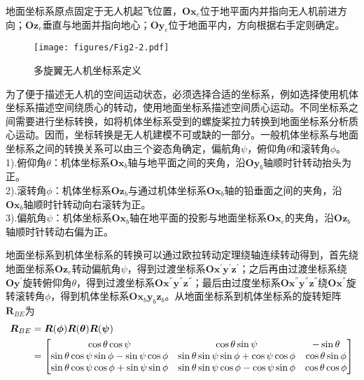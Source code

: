 地面坐标系原点固定于无人机起飞位置，$\boldsymbol{O} \boldsymbol{x}_e$位于地平面内并指向无人机前进方向；$\boldsymbol{O} \boldsymbol{z}_e$垂直与地面并指向地心；$\boldsymbol{O} \boldsymbol{y}_e$位于地面平内，方向根据右手定则确定。

\begin{figure}[h]
\centering
\texttt{[image: figures/Fig2-2.pdf]}
\caption{多旋翼无人机坐标系定义}
\label{fig2.2}
\end{figure}

为了便于描述无人机的空间运动状态，必须选择合适的坐标系，例如选择使用机体坐标系描述空间绕质心的转动，使用地面坐标系描述空间质心运动。不同坐标系之间需要进行坐标转换，如将机体坐标系受到的螺旋桨拉力转换到地面坐标系分析质心运动。因而，坐标转换是无人机建模不可或缺的一部分。一般机体坐标系与地面坐标系之间的转换关系可以由三个姿态角确定，偏航角$\psi$，俯仰角$\theta$和滚转角$\phi$。\\
1).俯仰角$\theta$：机体坐标系$\boldsymbol{O} \boldsymbol{x}_b$轴与地平面之间的夹角，沿$\boldsymbol{O} \boldsymbol{y}_b$轴顺时针转动抬头为正。\\
2).滚转角$\phi$：机体坐标系$\boldsymbol{O} \boldsymbol{z}_b$与通过机体坐标系$\boldsymbol{O} \boldsymbol{x}_b$轴的铅垂面之间的夹角，沿$\boldsymbol{O} \boldsymbol{x}_b$轴顺时针转动向右滚转为正。\\
3).偏航角$\psi$：机体坐标系$\boldsymbol{O} \boldsymbol{x}_b$轴在地平面的投影与地面坐标系$\boldsymbol{O} \boldsymbol{x}_e$的夹角，沿$\boldsymbol{O} \boldsymbol{z}_b$轴顺时针转动右偏为正。

地面坐标系到机体坐标系的转换可以通过欧拉转动定理绕轴连续转动得到，首先绕地面坐标系$\boldsymbol{O} \boldsymbol{z}_e$转动偏航角$\psi$，得到过渡坐标系$\boldsymbol{O} \boldsymbol{x}^{'} \boldsymbol{y}^{'} \boldsymbol{z}^{'}$；之后再由过渡坐标系绕$\boldsymbol{O} \boldsymbol{y}^{'}$旋转俯仰角$\theta$，得到过渡坐标系$\boldsymbol{O} \boldsymbol{x}^{''} \boldsymbol{y}^{''} \boldsymbol{z}^{''}$；最后由过度坐标系$\boldsymbol{O} \boldsymbol{x}^{''} \boldsymbol{y}^{''} \boldsymbol{z}^{''}$绕$\boldsymbol{O} \boldsymbol{x}^{''}$旋转滚转角$\phi$，得到机体坐标系$\boldsymbol{O} \boldsymbol{x}_b \boldsymbol{y}_b \boldsymbol{z}_b$。从地面坐标系到机体坐标系的旋转矩阵$\boldsymbol{R}_{BE}$为
\begin{equation}
\label{equ2.1}
\begin{aligned}
\boldsymbol{R}_{BE} 
&= \boldsymbol{R}(\boldsymbol{\phi}) \boldsymbol{R}(\boldsymbol{\theta}) \boldsymbol{R}(\boldsymbol{\psi}) \\ 
&= 
\begin{bmatrix}
\cos\theta \cos\psi & \cos\theta \sin\psi & -\sin\theta \cr
\sin\theta \cos\psi \sin\phi - \sin\psi \cos\phi & \sin\theta \sin\psi \sin\phi + \cos\psi \cos\phi & \cos\theta \sin\phi \cr
\sin\theta \cos\psi \cos\phi + \sin\psi \sin\phi & \sin\theta \sin\psi \cos\phi - \cos\psi \sin\phi & \cos\theta \cos\phi \cr
\end{bmatrix}
\end{aligned}
\end{equation}

